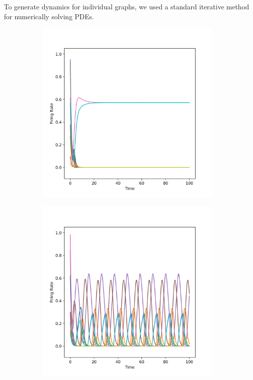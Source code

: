 \documentclass[psamsfonts]{amsart}
\theoremstyle{definition}
\theoremstyle{remark}
\numberwithin{equation}{section}
\begin{document}
To generate dynamics for individual graphs, we used a standard iterative method for numerically solving PDEs.
\begin{figure}[h]
     \centering
     \begin{subfigure}{0.45\textwidth}
         \centering
         \includegraphics[scale = 0.4]{./Figures/Matrix Size 10 Symmetry 0.100 0.6 0.1 12.png}
         \label{fig:1a}
     \end{subfigure}
     \begin{subfigure}{0.45\textwidth}
         \centering
         \includegraphics[scale = 0.4]{./Figures/Matrix Size 10 Symmetry 0.100 0.6 0.1 13.png}

\end{subfigure}
\end{figure}
\end{document}
